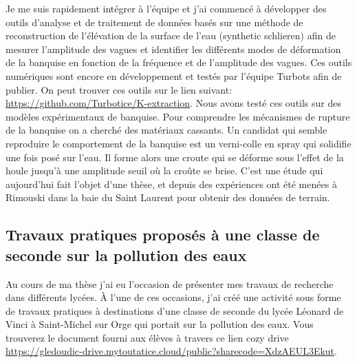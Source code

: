 \documentclass[french, 10pt]{article}
\begin{document}
Je me suis rapidement intégrer à l'équipe et  j'ai commencé à développer des outils d'analyse et de traitement de données basés sur une méthode de reconstruction de l'élévation de la surface de l'eau (synthetic schlieren) afin de mesurer l'amplitude des vagues et identifier les différents modes de déformation de la banquise en fonction de la fréquence et de l'amplitude des vagues. Ces outils numériques sont encore en développement et testés par l'équipe Turbots afin de publier. On peut trouver ces outils sur le lien suivant: \url{https://github.com/Turbotice/K-extraction}. Nous avons testé ces outils sur des modèles expérimentaux de \og{}banquise\fg{}. Pour comprendre les mécanismes de rupture de la banquise on a cherché des matériaux cassants. Un candidat qui semble reproduire le comportement de la banquise est un verni-colle en spray qui solidifie une fois posé sur l'eau. Il forme alors une croute qui se déforme sous l'effet de la houle jusqu'à une amplitude seuil où la croûte se brise. C'est une étude qui aujourd'hui fait l'objet d'une thèse, et depuis des expériences ont été menées à Rimouski dans la baie du Saint Laurent pour obtenir des données de terrain.


\subsection{Travaux pratiques proposés à une classe de seconde sur la pollution des eaux}

Au cours de ma thèse j'ai eu l'occasion de présenter mes travaux de recherche dans différents lycées. À l'une de ces occasions, j'ai créé une activité sous forme de travaux pratiques à destinations d'une classe de seconde du lycée Léonard de Vinci à Saint-Michel sur Orge qui portait sur la pollution des eaux. Vous trouverez le document fourni aux élèves à travers ce lien cozy drive \url{https://gledoudic-drive.mytoutatice.cloud/public?sharecode=XdzAEUL3Ekut}.\medskip
\end{document}

